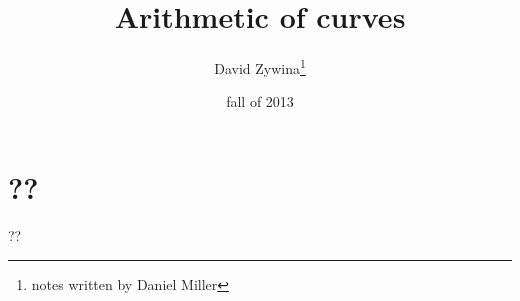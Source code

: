 \documentclass{article}
\title{Arithmetic of curves}
\author{David Zywina\thanks{notes written by Daniel Miller}}
\date{fall of 2013}
\theoremstyle{definition}
\begin{document}
\maketitle










\section{??}

??
\end{document}
